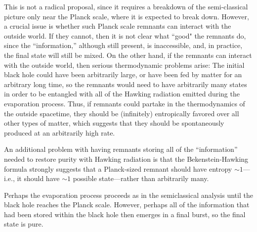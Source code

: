 \documentclass[12pt,nofootinbib,amsmath,amssymb,amsfonts,aps,prd,groupedaddress]{revtex4-1}
\begin{document}
This is not a radical proposal, since it requires a breakdown of the
semi-classical picture only near the Planck scale, where it is expected to break
down. However, a crucial issue is whether such Planck scale remnants can interact with the
outside world. If they cannot, then 
it is not clear what ``good" the remnants do, since the
``information,'' although still present, is inaccessible, and, in practice, the final state 
will still be mixed. On the other hand, if the remnants can interact with the outside
world, then serious thermodynamic problems arise:
The initial black hole could have been
arbitrarily large, or have been fed by matter for an arbitrary long time,
so the remnants would need to have arbitrarily many states in
order to be entangled with all of the Hawking radiation emitted during the
evaporation process. Thus, if remnants could partake in the thermodynamics of the 
outside spacetime, they should be (infinitely) entropically favored over all
other types of matter, which suggests that they should be spontaneously produced at an 
arbitrarily high rate.

An additional problem with having remnants storing all of the ``information'' needed to
restore purity with Hawking radiation is that the Bekenstein-Hawking formula strongly
suggests that a Planck-sized remnant should have entropy $\sim 1$---i.e., it
should have $\sim 1$ possible state---rather than arbitrarily many. 


\medskip {} Perhaps the evaporation process proceeds as in the semiclassical
analysis until the black hole reaches the Planck scale. However, perhaps all of
the information that had been stored within the black hole then emerges in a
final burst, so the final state is pure.
\end{document}
